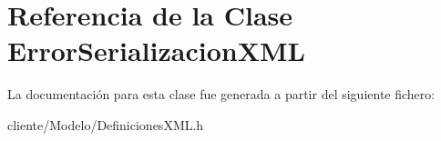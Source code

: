 \hypertarget{classErrorSerializacionXML}{\section{\-Referencia de la \-Clase \-Error\-Serializacion\-X\-M\-L}
\label{classErrorSerializacionXML}
}


\-La documentación para esta clase fue generada a partir del siguiente fichero\-:\begin{DoxyCompactItemize}
\item 
cliente/\-Modelo/\-Definiciones\-X\-M\-L.\-h\end{DoxyCompactItemize}
